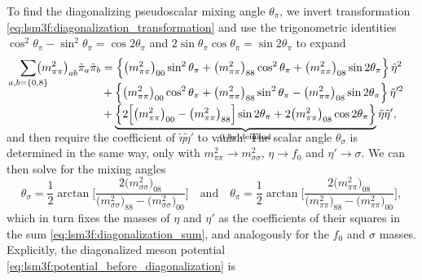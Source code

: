 To find the diagonalizing pseudoscalar mixing angle $\theta_\pi$,
we invert transformation \eqref{eq:lsm3f:diagonalization_transformation} and use the trigonometric identities $\cos^2 \theta_\pi - \sin^2 \theta_\pi = \cos 2 \theta_\pi$ and $2 \sin\theta_\pi \cos\theta_\pi = \sin 2 \theta_\pi$ to expand
\begin{equation}
\begin{split}
	\smash{\smashoperator{\sum_{a,b=\{0,8\}}}} \big(m^2_{\pi\pi}\big)_{ab} \tilde{\pi}_a \tilde{\pi}_b &= \Big\{ \big(m^2_{\pi\pi}\big)_{00} \sin^2 \theta_\pi + \big(m^2_{\pi\pi}\big)_{88} \cos^2 \theta_\pi + \big(m^2_{\pi\pi}\big)_{08} \sin 2 \theta_\pi \Big\} \, \tilde{\eta}^2 \\
	                                                                                                   &+ \Big\{ \big(m^2_{\pi\pi}\big)_{00} \cos^2 \theta_\pi + \big(m^2_{\pi\pi}\big)_{88} \sin^2 \theta_\pi - \big(m^2_{\pi\pi}\big)_{08} \sin 2 \theta_\pi \Big\} \, \tilde{\eta}'^2 \\
	                                                                                                   &+ \smash{\underbrace{\Big\{ 2 \Big[ \big(m^2_{\pi\pi}\big)_{00} - \big(m^2_{\pi\pi}\big)_{88} \Big] \sin 2 \theta_\pi + 2 \big(m^2_{\pi\pi}\big)_{08} \cos 2 \theta_\pi \Big\}}_{\text{$0$ by demand}}} \, \tilde{\eta} \tilde{\eta}' ,
\end{split}
\label{eq:lsm3f:diagonalization_sum}
\end{equation}
and then require the coefficient of $\tilde{\eta} \tilde{\eta}'$ to vanish.
The scalar angle $\theta_\sigma$ is determined in the same way, only with $m^2_{\pi\pi} \rightarrow m^2_{\sigma\sigma}$, $\eta \rightarrow f_0$ and $\eta' \rightarrow \sigma$.
We can then solve for the mixing angles
\begin{equation}
	\theta_\sigma = \frac12 \arctan \Bigg[ \frac{2\big(m^2_{\sigma\sigma}\big)_{08}}{\big(m^2_{\sigma\sigma}\big)_{88} - \big(m^2_{\sigma\sigma}\big)_{00}} \Bigg]
	\quad \text{and} \quad
	\theta_\pi = \frac12 \arctan \Bigg[ \frac{2\big(m^2_{\pi\pi}\big)_{08}}{\big(m^2_{\pi\pi}\big)_{88} - \big(m^2_{\pi\pi}\big)_{00}} \Bigg],
\label{eq:lsm3f:mixing_angles}
\end{equation}
which in turn fixes the masses of $\eta$ and $\eta'$ as the coefficients of their squares in the sum \eqref{eq:lsm3f:diagonalization_sum}, and analogously for the $f_0$ and $\sigma$ masses.
Explicitly, the diagonalized meson potential \eqref{eq:lsm3f:potential_before_diagonalization} is
